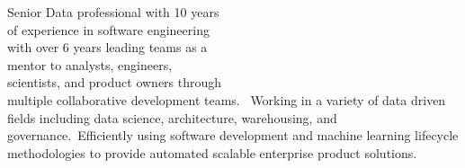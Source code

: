
Senior Data professional with 10 years
\\of experience in software engineering
\\with over 6 years leading teams as a
\\mentor to analysts, engineers,
\\scientists, and product owners through
\\multiple collaborative development teams.
\ Working in a
variety of data driven fields including
data science, architecture, warehousing,
and governance.\ Efficiently using software
development and machine learning lifecycle
methodologies to provide automated
scalable enterprise product solutions.